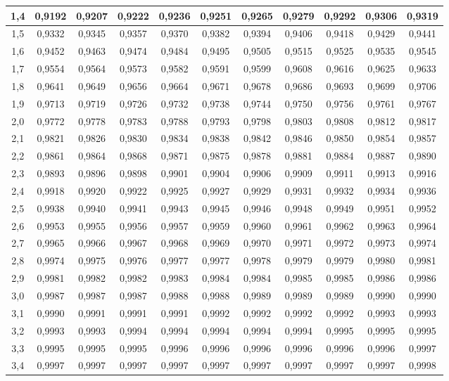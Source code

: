 \documentclass[
]{book}
\begin{document}
\begin{table}
{\begin{tabular}[t]{c|c|c|c|c|c|c|c|c|c|c}
\hline
1,4 & 0,9192 & 0,9207 & 0,9222 & 0,9236 & 0,9251 & 0,9265 & 0,9279 & 0,9292 & 0,9306 & 0,9319\\
\hline
1,5 & 0,9332 & 0,9345 & 0,9357 & 0,9370 & 0,9382 & 0,9394 & 0,9406 & 0,9418 & 0,9429 & 0,9441\\
\hline
1,6 & 0,9452 & 0,9463 & 0,9474 & 0,9484 & 0,9495 & 0,9505 & 0,9515 & 0,9525 & 0,9535 & 0,9545\\
\hline
1,7 & 0,9554 & 0,9564 & 0,9573 & 0,9582 & 0,9591 & 0,9599 & 0,9608 & 0,9616 & 0,9625 & 0,9633\\
\hline
1,8 & 0,9641 & 0,9649 & 0,9656 & 0,9664 & 0,9671 & 0,9678 & 0,9686 & 0,9693 & 0,9699 & 0,9706\\
\hline
1,9 & 0,9713 & 0,9719 & 0,9726 & 0,9732 & 0,9738 & 0,9744 & 0,9750 & 0,9756 & 0,9761 & 0,9767\\
\hline
2,0 & 0,9772 & 0,9778 & 0,9783 & 0,9788 & 0,9793 & 0,9798 & 0,9803 & 0,9808 & 0,9812 & 0,9817\\
\hline
2,1 & 0,9821 & 0,9826 & 0,9830 & 0,9834 & 0,9838 & 0,9842 & 0,9846 & 0,9850 & 0,9854 & 0,9857\\
\hline
2,2 & 0,9861 & 0,9864 & 0,9868 & 0,9871 & 0,9875 & 0,9878 & 0,9881 & 0,9884 & 0,9887 & 0,9890\\
\hline
2,3 & 0,9893 & 0,9896 & 0,9898 & 0,9901 & 0,9904 & 0,9906 & 0,9909 & 0,9911 & 0,9913 & 0,9916\\
\hline
2,4 & 0,9918 & 0,9920 & 0,9922 & 0,9925 & 0,9927 & 0,9929 & 0,9931 & 0,9932 & 0,9934 & 0,9936\\
\hline
2,5 & 0,9938 & 0,9940 & 0,9941 & 0,9943 & 0,9945 & 0,9946 & 0,9948 & 0,9949 & 0,9951 & 0,9952\\
\hline
2,6 & 0,9953 & 0,9955 & 0,9956 & 0,9957 & 0,9959 & 0,9960 & 0,9961 & 0,9962 & 0,9963 & 0,9964\\
\hline
2,7 & 0,9965 & 0,9966 & 0,9967 & 0,9968 & 0,9969 & 0,9970 & 0,9971 & 0,9972 & 0,9973 & 0,9974\\
\hline
2,8 & 0,9974 & 0,9975 & 0,9976 & 0,9977 & 0,9977 & 0,9978 & 0,9979 & 0,9979 & 0,9980 & 0,9981\\
\hline
2,9 & 0,9981 & 0,9982 & 0,9982 & 0,9983 & 0,9984 & 0,9984 & 0,9985 & 0,9985 & 0,9986 & 0,9986\\
\hline
3,0 & 0,9987 & 0,9987 & 0,9987 & 0,9988 & 0,9988 & 0,9989 & 0,9989 & 0,9989 & 0,9990 & 0,9990\\
\hline
3,1 & 0,9990 & 0,9991 & 0,9991 & 0,9991 & 0,9992 & 0,9992 & 0,9992 & 0,9992 & 0,9993 & 0,9993\\
\hline
3,2 & 0,9993 & 0,9993 & 0,9994 & 0,9994 & 0,9994 & 0,9994 & 0,9994 & 0,9995 & 0,9995 & 0,9995\\
\hline
3,3 & 0,9995 & 0,9995 & 0,9995 & 0,9996 & 0,9996 & 0,9996 & 0,9996 & 0,9996 & 0,9996 & 0,9997\\
\hline
3,4 & 0,9997 & 0,9997 & 0,9997 & 0,9997 & 0,9997 & 0,9997 & 0,9997 & 0,9997 & 0,9997 & 0,9998\\
\hline
\end{tabular}}
\end{table}
\end{document}
